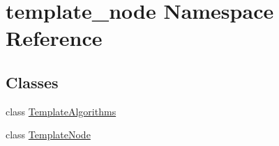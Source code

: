 \hypertarget{namespacetemplate__node}{}\section{template\+\_\+node Namespace Reference}
\label{namespacetemplate__node}
\subsection*{Classes}
\begin{DoxyCompactItemize}
\item 
class \hyperlink{classtemplate__node_1_1TemplateAlgorithms}{Template\+Algorithms}
\item 
class \hyperlink{classtemplate__node_1_1TemplateNode}{Template\+Node}
\end{DoxyCompactItemize}
